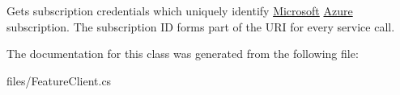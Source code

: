 Gets subscription credentials which uniquely identify \hyperlink{namespace_microsoft}{Microsoft} \hyperlink{namespace_microsoft_1_1_azure}{Azure} subscription. The subscription ID forms part of the U\+RI for every service call. 



The documentation for this class was generated from the following file\+:\begin{DoxyCompactItemize}
\item 
files/Feature\+Client.\+cs\end{DoxyCompactItemize}
